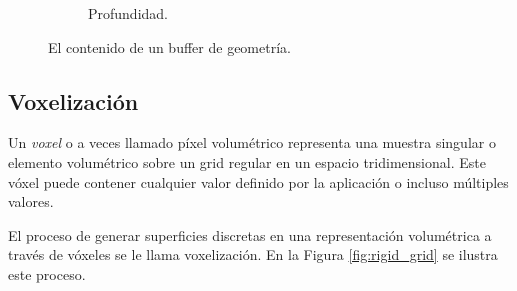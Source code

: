 \begin{figure}[H]
\begin{subfigure}[t]{0.32\textwidth}
		\caption*{Profundidad.}
	\end{subfigure}%
	\caption{El contenido de un buffer de geometría.}
	\label{fig:gbuffer}
\end{figure}

\subsection{Voxelización}
\label{sec:voxelization}
Un \emph{voxel} o a veces llamado píxel volumétrico representa una muestra singular o elemento volumétrico sobre un grid regular en un espacio tridimensional. Este vóxel puede contener cualquier valor definido por la aplicación o incluso múltiples valores. 

El proceso de generar superficies discretas en una representación volumétrica a través de vóxeles se le llama voxelización. En la Figura \ref{fig:rigid_grid} se ilustra este proceso.


